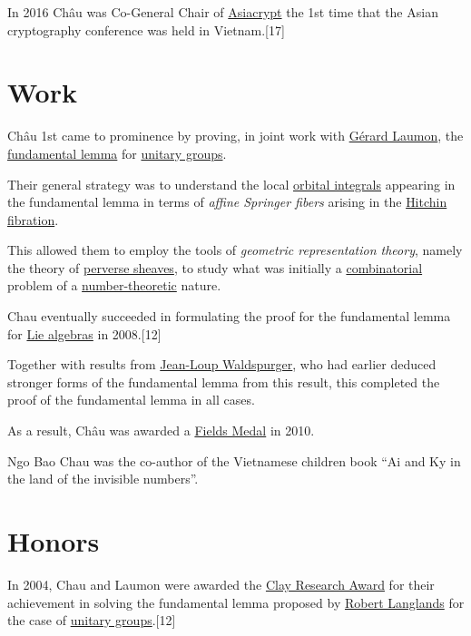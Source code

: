 \documentclass{book}
\numberwithin{equation}{section}
\begin{document}
In 2016 Châu was Co-General Chair of \href{https://en.wikipedia.org/wiki/Asiacrypt}{Asiacrypt} the 1st time that the Asian cryptography conference was held in Vietnam.[17]

\section{Work}
Châu 1st came to prominence by proving, in joint work with \href{https://en.wikipedia.org/wiki/G%C3%A9rard_Laumon}{Gérard Laumon}, the \href{https://en.wikipedia.org/wiki/Fundamental_lemma_(Langlands_program)}{fundamental lemma} for \href{https://en.wikipedia.org/wiki/Unitary_group}{unitary groups}.
    
Their general strategy was to understand the local \href{https://en.wikipedia.org/wiki/Orbital_integral}{orbital integrals} appearing in the fundamental lemma in terms of \textit{affine Springer fibers} arising in the \href{https://en.wikipedia.org/wiki/Hitchin_fibration}{Hitchin fibration}.

This allowed them to employ the tools of \textit{geometric representation theory}, namely the theory of \href{https://en.wikipedia.org/wiki/Perverse_sheaves}{perverse sheaves}, to study what was initially a \href{https://en.wikipedia.org/wiki/Combinatorics}{combinatorial} problem of a \href{https://en.wikipedia.org/wiki/Number_theory}{number-theoretic} nature.

Chau eventually succeeded in formulating the proof for the fundamental lemma for \href{https://en.wikipedia.org/wiki/Lie_algebra}{Lie algebras} in 2008.[12]

Together with results from \href{https://en.wikipedia.org/wiki/Jean-Loup_Waldspurger}{Jean-Loup Waldspurger}, who had earlier deduced stronger forms of the fundamental lemma from this result, this completed the proof of the fundamental lemma in all cases.

As a result, Châu was awarded a \href{https://en.wikipedia.org/wiki/Fields_Medal}{Fields Medal} in 2010.

%
Ngo Bao Chau was the co-author of the Vietnamese children book ``Ai and Ky in the land of the invisible numbers''.

\section{Honors}
In 2004, Chau and Laumon were awarded the \href{https://en.wikipedia.org/wiki/Clay_Research_Award}{Clay Research Award} for their achievement in solving the fundamental lemma proposed by \href{https://en.wikipedia.org/wiki/Robert_Langlands}{Robert Langlands} for the case of \href{https://en.wikipedia.org/wiki/Unitary_group}{unitary groups}.[12]
\end{document}
